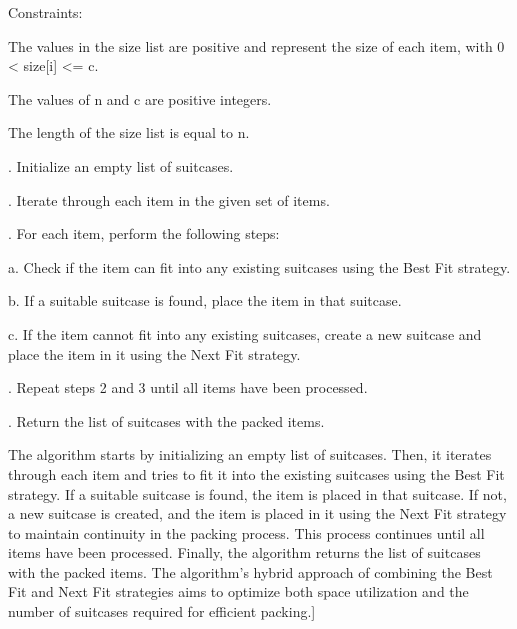 \documentclass[12pt]{article}
\begin{document}
\vspace{0.3cm}
\noindent Constraints:


\noindent The values in the size list are positive and represent the size of each item, with 0 < size[i] <= c.


\noindent The values of n and c are positive integers.

\noindent The length of the size list is equal to n.

\vspace{0.2cm}

. Initialize an empty list of suitcases.

\vspace{0.1cm}

. Iterate through each item in the given set of items.

\vspace{0.1cm}

. For each item, perform the following steps:

\vspace{0.1cm}

\hspace{0.1cm}a. Check if the item can fit into any existing suitcases using the Best Fit strategy.

\vspace{0.1cm}

\hspace{0.1cm} b. If a suitable suitcase is found, place the item in that suitcase.

\vspace{0.1cm}

\hspace{0.1cm} c. If the item cannot fit into any existing suitcases, create a new suitcase and place the item in it using the Next Fit strategy.

\vspace{0.1cm}

. Repeat steps 2 and 3 until all items have been processed.

\vspace{0.1cm}

. Return the list of suitcases with the packed items.


\vspace{0.1cm}

\hspace{1cm}The algorithm starts by initializing an empty list of suitcases. Then, it iterates through each item and tries to fit it into the existing suitcases using the Best Fit strategy. If a suitable suitcase is found, the item is placed in that suitcase. If not, a new suitcase is created, and the item is placed in it using the Next Fit strategy to maintain continuity in the packing process. This process continues until all items have been processed. Finally, the algorithm returns the list of suitcases with the packed items. The algorithm's hybrid approach of combining the Best Fit and Next Fit strategies aims to optimize both space utilization and the number of suitcases required for efficient packing.]
\end{document}
